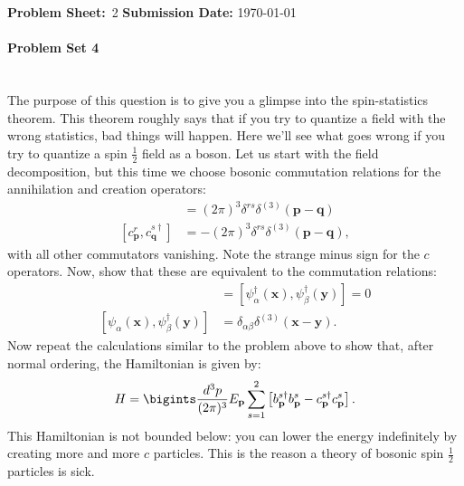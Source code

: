 {\large\textbf{Problem Sheet:}\ \textsc{2} \hspace{\hfill} \large\textbf{Submission Date:} \today\\
	\hline\hline
\paragraph*{Problem Set 4} %
\\
The purpose of this question is to give you a glimpse into the spin-statistics theorem. This theorem roughly says that if you try to quantize a field with the wrong statistics, bad things will happen. Here we'll see what goes wrong if you try to quantize a spin $\displaystyle\frac{1}{2}$ field as a boson. Let us start with the field decomposition, but this time we choose bosonic commutation relations for the annihilation and creation operators:
\begin{align}
    [b^r_{\mathbf{p}}, b^{s\dagger}_{\mathbf{q}}] &= (2\pi)^3 \delta^{rs} \delta^{(3)}(\mathbf{p} - \mathbf{q})\\
    [c^r_{\mathbf{p}}, c^{s\dagger}_{\mathbf{q}}] &= -(2\pi)^3 \delta^{rs} \delta^{(3)}(\mathbf{p} - \mathbf{q}),
\end{align}
with all other commutators vanishing. Note the strange minus sign for the $c$ operators. Now, show that these are equivalent to the commutation relations:
\begin{align}
    [\psi_\alpha(\mathbf{x}), \psi_\beta(\mathbf{y})] &= [\psi^\dagger_\alpha(\mathbf{x}), \psi^\dagger_\beta(\mathbf{y})] = 0\\
    [\psi_\alpha(\mathbf{x}), \psi^\dagger_\beta(\mathbf{y})] &= \delta_{\alpha\beta} \delta^{(3)}(\mathbf{x} - \mathbf{y}).
\end{align}
Now repeat the calculations similar to the problem above to show that, after normal ordering, the Hamiltonian is given by:
\begin{align}
    H = \bigints\frac{d^3p}{(2\pi)^3} E_{\mathbf{p}} \sum_{s=1}^2 \left[ b^{s\dagger}_{\mathbf{p}} b^s_{\mathbf{p}} - c^{s\dagger}_{\mathbf{p}} c^s_{\mathbf{p}} \right].
\end{align}
This Hamiltonian is not bounded below: you can lower the energy indefinitely by creating more and more $c$ particles. This is the reason a theory of bosonic spin $\displaystyle\frac{1}{2}$ particles is sick.
\bigskip\bigskip\hline\hline\bigskip
}
